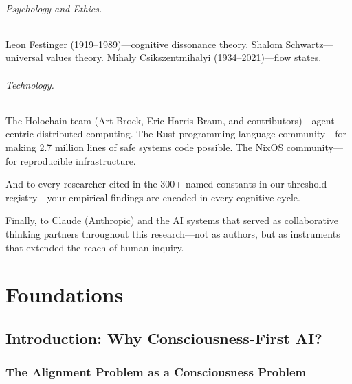 \documentclass[12pt]{book}
\begin{document}
\paragraph{Psychology and Ethics.}
Leon Festinger (1919--1989)---cognitive dissonance theory.
Shalom Schwartz---universal values theory.
Mihaly Csikszentmihalyi (1934--2021)---flow states.

\paragraph{Technology.}
The Holochain team (Art Brock, Eric Harris-Braun, and contributors)---agent-centric distributed computing.
The Rust programming language community---for making 2.7 million lines of safe systems code possible.
The NixOS community---for reproducible infrastructure.

\vspace{0.5cm}
And to every researcher cited in the 300+ named constants in our threshold registry---your empirical findings are encoded in every cognitive cycle.

Finally, to Claude (Anthropic) and the AI systems that served as collaborative thinking partners throughout this research---not as authors, but as instruments that extended the reach of human inquiry.

\tableofcontents

\mainmatter


\part{Foundations}

\chapter{Introduction: Why Consciousness-First AI?}
\label{ch:introduction}

\section{The Alignment Problem as a Consciousness Problem}
\end{document}

